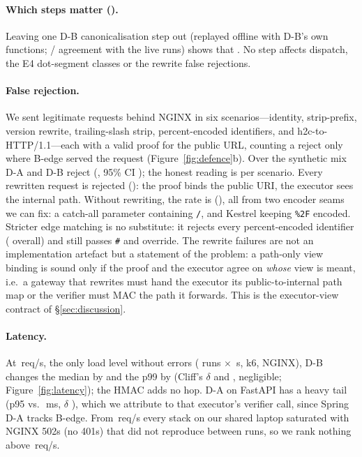 \paragraph{Which steps matter ().} Leaving one D-B canonicalisation
step out (replayed offline with D-B's own functions; \NumAtwoAgree{}/\NumAtwoAgree{}
agreement with the live runs) shows that \AblTwoResult{}. No step affects \GA
dispatch, the E4 dot-segment classes or the rewrite false rejections.

\paragraph{False rejection.} We sent \NumFRRRequests{} legitimate requests
behind NGINX in six scenarios---identity, strip-prefix, version rewrite,
trailing-slash strip, percent-encoded identifiers, and h2c-to-HTTP/1.1---each
with a valid proof for the public URL, counting a reject only where B-edge
served the request (Figure~\ref{fig:defence}b). Over the synthetic mix D-A
and D-B reject \FRRAllDAB{} (\FRRAllN{}, 95\% CI \FRRAllDABCI{}); the honest
reading is per scenario. Every rewritten request is rejected (\FRRRewriteN{}):
the proof binds the public URI, the executor sees the internal path. Without
rewriting, the rate is \FRRNonRewriteDAB{} (\FRRNonRewriteN{}), all from two
encoder seams we can fix: a catch-all parameter containing \texttt{/}, and
Kestrel keeping \texttt{\%2F} encoded. Stricter edge matching is no
substitute: it rejects every percent-encoded identifier (\FRRAllStrict{}
overall) and still passes \texttt{\#} and override. The rewrite failures are
not an implementation artefact but a statement of the problem: a path-only view
binding is sound only if the proof and the executor agree on \emph{whose} view
is meant, i.e.\ a gateway that rewrites must hand the executor its
public-to-internal path map or the verifier must MAC the path it forwards.
This is the executor-view contract of \S\ref{sec:discussion}.

\paragraph{Latency.} At \PerfRate{}\,req/s, the only load level without errors
(\PerfRuns{} runs $\times$ \PerfRunSecs{}\,s, k6, NGINX), D-B changes the
median by \DefenceOverheadPfifty{} and the p99 by
\DefenceOverheadPninetynine{} (Cliff's $\delta$ \DefenceCliffFastapi{} and
\DefenceCliffSpring{}, negligible; Figure~\ref{fig:latency}); the HMAC adds no
hop. D-A on FastAPI has a heavy tail (p95 \PerfDAFastapiPninetyfive{} vs.\
\PerfBEdgeFastapiPninetyfive{}\,ms, $\delta$ \PerfDACliffFastapi{}), which
we attribute to that executor's verifier call, since Spring D-A tracks B-edge.
From \PerfSatRate{}\,req/s every stack on our shared laptop saturated with
NGINX 502s (no 401s) that did not reproduce between runs, so we rank nothing
above \PerfRate{}\,req/s.

